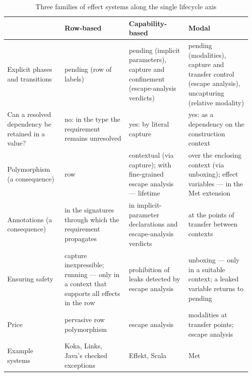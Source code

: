 \documentclass[11pt]{article}
\begin{document}
\begin{table}[!tbp]
  \caption{Three families of effect systems along the single lifecycle axis}
  \label{tbl:compare}
  \centering
  \footnotesize
  \begin{tabular}{>{\raggedright\arraybackslash}p{2.6cm}>{\raggedright\arraybackslash}p{3.2cm}>{\raggedright\arraybackslash}p{3.2cm}>{\raggedright\arraybackslash}p{3.6cm}}
  \toprule
  & \textbf{Row-based} & \textbf{Capability-based} & \textbf{Modal} \\
  \midrule
  Explicit phases and transitions & pending (row of labels) & pending (implicit parameters), capture and confinement (escape-analysis verdicts) & pending (modalities), capture and transfer control (escape analysis), uncapturing (relative modality) \\
  Can a resolved dependency be retained in a value? & no: in the type the requirement remains unresolved & yes: by literal capture & yes: as a dependency on the construction context \\
  Polymorphism (a consequence) & row & contextual (via capture); with fine-grained escape analysis --- lifetime & over the enclosing context (via unboxing); effect variables --- in the Met extension \\
  Annotations (a consequence) & in the signatures through which the requirement propagates & in implicit-parameter declarations and escape-analysis verdicts & at the points of transfer between contexts \\
  Ensuring safety & capture inexpressible; running --- only in a context that supports all effects in the row & prohibition of leaks detected by escape analysis & unboxing --- only in a suitable context; a leaked variable returns to pending \\
  Price & pervasive row polymorphism & escape analysis & modalities at transfer points; escape analysis \\
  Example systems & Koka, Links, Java's checked exceptions & Effekt, Scala & Met~\cite{tang2025modal} \\
  \bottomrule
  \end{tabular}
\end{table}
\end{document}
